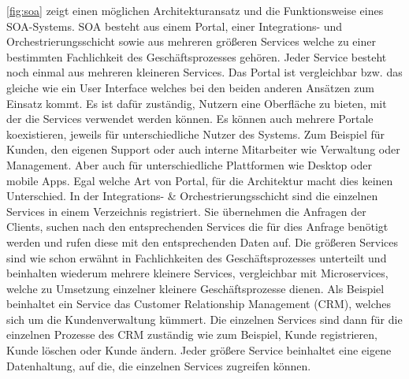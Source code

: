 \ref{fig:soa} zeigt einen möglichen Architekturansatz und die Funktionsweise eines SOA-Systems. SOA besteht aus einem Portal, einer Integrations- und Orchestrierungsschicht sowie aus mehreren größeren Services welche zu einer bestimmten Fachlichkeit des Geschäftsprozesses gehören. Jeder Service besteht noch einmal aus mehreren kleineren Services.\newline
Das Portal ist vergleichbar bzw. das gleiche wie ein User Interface welches bei den beiden anderen Ansätzen zum Einsatz kommt. Es ist dafür zuständig, Nutzern eine Oberfläche zu bieten, mit der die Services verwendet werden können. Es können auch mehrere Portale koexistieren, jeweils für unterschiedliche Nutzer des Systems. Zum Beispiel für Kunden, den eigenen Support oder auch interne Mitarbeiter wie Verwaltung oder Management. Aber auch für unterschiedliche Plattformen wie Desktop oder mobile Apps. Egal welche Art von Portal, für die Architektur macht dies keinen Unterschied.\newline
In der Integrations- \& Orchestrierungsschicht sind die einzelnen Services in einem Verzeichnis registriert. Sie übernehmen die Anfragen der Clients, suchen nach den entsprechenden Services die für dies Anfrage benötigt werden und rufen diese mit den entsprechenden Daten auf.\newline
Die größeren Services sind wie schon erwähnt in Fachlichkeiten des Geschäftsprozesses unterteilt und beinhalten wiederum mehrere kleinere Services, vergleichbar mit Microservices, welche zu Umsetzung einzelner kleinere Geschäftsprozesse dienen. Als Beispiel beinhaltet ein Service das Customer Relationship Management (CRM), welches sich um die Kundenverwaltung kümmert. Die einzelnen Services sind dann für die einzelnen Prozesse des CRM zuständig wie zum Beispiel, Kunde registrieren, Kunde löschen oder Kunde ändern. Jeder größere Service beinhaltet eine eigene Datenhaltung, auf die, die einzelnen Services zugreifen können.\newline\newline

